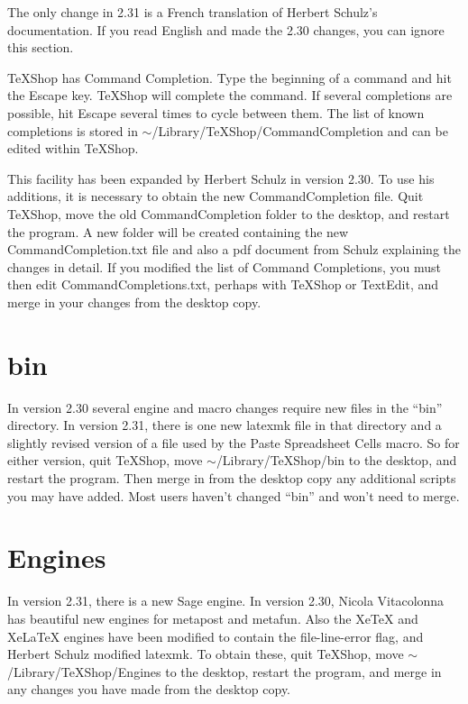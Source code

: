 \documentclass[11pt, oneside]{amsart}
\begin{document}
The only change in 2.31 is a French translation of Herbert Schulz's documentation. If you read English and made the 2.30 changes, you can ignore this section. 

TeXShop has Command Completion. Type the beginning of a command and hit the Escape key. TeXShop will complete the command. If several completions are possible, hit Escape several times to cycle between them.
The list of known completions is stored in $\sim$/Library/TeXShop/CommandCompletion and  can be edited within TeXShop.

This facility has been expanded by Herbert Schulz in version 2.30. To use his additions, it is necessary to obtain the new CommandCompletion file. Quit TeXShop,  move the old CommandCompletion folder to the desktop,   and restart the program. A new folder will be created containing the new CommandCompletion.txt file and also a pdf document from Schulz explaining the changes in detail. If you modified the list of Command Completions, you must then edit CommandCompletions.txt, perhaps with TeXShop or TextEdit, and merge in your changes from the desktop copy.

\section{bin}

In version 2.30 several engine and macro changes require new files in the ``bin'' directory. In version 2.31, there is one new latexmk file in that directory and a slightly revised version of a file used by the Paste Spreadsheet Cells macro. So for either version, quit TeXShop, move $\sim$/Library/TeXShop/bin to the desktop, and restart the program. Then merge in from the desktop copy any additional scripts you may have added. Most users haven't changed ``bin'' and won't need to merge. 

\section{Engines}

In version 2.31, there is a new Sage engine. In version 2.30, Nicola Vitacolonna has beautiful new engines for metapost and metafun. Also the XeTeX and XeLaTeX engines have been modified to contain the file-line-error flag, and Herbert Schulz modified latexmk. To obtain these, quit TeXShop, move $\sim$/Library/TeXShop/Engines to the desktop, restart the program, and merge in any changes you have made from the desktop copy.
\end{document}
